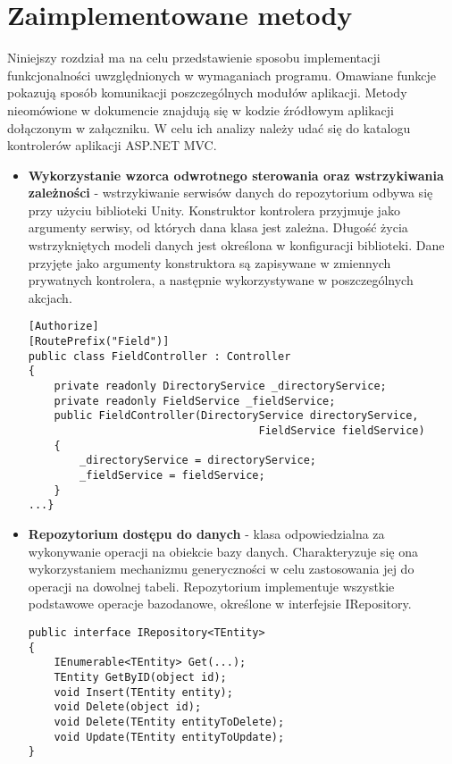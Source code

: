 \section{Zaimplementowane metody}
Niniejszy rozdział ma na celu przedstawienie sposobu implementacji funkcjonalności uwzględnionych w wymaganiach programu. Omawiane funkcje pokazują sposób komunikacji poszczególnych modułów aplikacji. Metody nieomówione w dokumencie znajdują się w kodzie źródłowym aplikacji dołączonym w załączniku. W celu ich analizy należy udać się do katalogu kontrolerów aplikacji ASP.NET MVC.
\\
\begin{itemize}
\item \textbf{Wykorzystanie wzorca odwrotnego sterowania oraz wstrzykiwania zależności} - wstrzykiwanie serwisów danych do repozytorium odbywa się przy użyciu biblioteki Unity. Konstruktor kontrolera przyjmuje jako argumenty serwisy, od których dana klasa jest zależna. Długość życia wstrzykniętych modeli danych jest określona w konfiguracji biblioteki. Dane przyjęte jako argumenty konstruktora są zapisywane w zmiennych prywatnych kontrolera, a następnie wykorzystywane w poszczególnych akcjach.

\begin{lstlisting}[caption=Wstrzyknięcie serwisów danych do konstruktora kontrolera]
[Authorize]
[RoutePrefix("Field")]
public class FieldController : Controller
{
	private readonly DirectoryService _directoryService;
	private readonly FieldService _fieldService;
	public FieldController(DirectoryService directoryService, 
									FieldService fieldService)
	{
		_directoryService = directoryService;
		_fieldService = fieldService;
	}
...}
\end{lstlisting}  

\item \textbf{Repozytorium dostępu do danych} - klasa odpowiedzialna za wykonywanie operacji na obiekcie bazy danych. Charakteryzuje się ona wykorzystaniem mechanizmu generyczności w celu zastosowania jej do operacji na dowolnej tabeli. Repozytorium implementuje wszystkie podstawowe operacje bazodanowe, określone w interfejsie IRepository.
\begin{lstlisting}[caption=Interfejs repozytorium dostępu do danych]
public interface IRepository<TEntity>
{
	IEnumerable<TEntity> Get(...);	
	TEntity GetByID(object id);
	void Insert(TEntity entity);
	void Delete(object id);
	void Delete(TEntity entityToDelete);
	void Update(TEntity entityToUpdate);
}
\end{lstlisting}  


\end{itemize}
